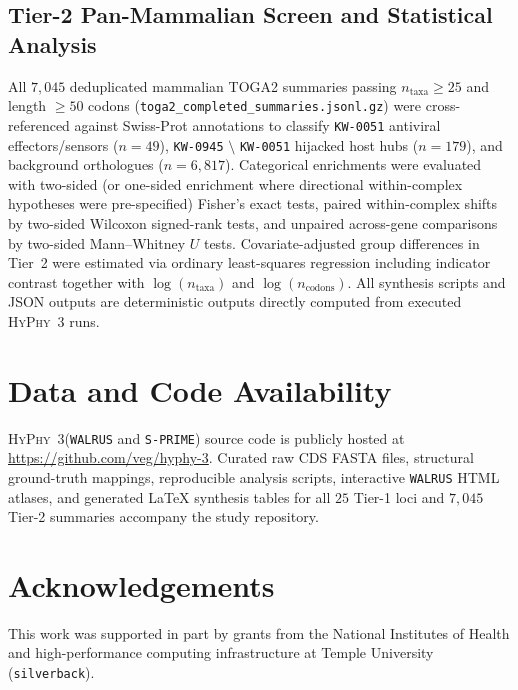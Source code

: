 \documentclass[11pt,letterpaper]{article}
\newcommand{\HyPhyThree}{\textsc{HyPhy~3}\xspace}
\newcommand{\WALRUS}{\texttt{WALRUS}\xspace}
\newcommand{\SPRIME}{\texttt{S-PRIME}\xspace}
\begin{document}
\subsection{Tier-2 Pan-Mammalian Screen and Statistical Analysis}

All $7,045$ deduplicated mammalian TOGA2 summaries passing $n_{\text{taxa}} \ge 25$ and length $\ge 50$ codons (\texttt{toga2\_completed\_summaries.jsonl.gz}) were cross-referenced against Swiss-Prot annotations to classify \texttt{KW-0051} antiviral effectors/sensors ($n = 49$), \texttt{KW-0945} $\setminus$ \texttt{KW-0051} hijacked host hubs ($n = 179$), and background orthologues ($n = 6,817$). Categorical enrichments were evaluated with two-sided (or one-sided enrichment where directional within-complex hypotheses were pre-specified) Fisher's exact tests, paired within-complex shifts by two-sided Wilcoxon signed-rank tests, and unpaired across-gene comparisons by two-sided Mann--Whitney $U$ tests. Covariate-adjusted group differences in Tier~2 were estimated via ordinary least-squares regression including indicator contrast together with $\log(n_{\text{taxa}})$ and $\log(n_{\text{codons}})$. All synthesis scripts and JSON outputs are deterministic outputs directly computed from executed \HyPhyThree runs.

\FloatBarrier

\section*{Data and Code Availability}

\HyPhyThree (\WALRUS and \SPRIME) source code is publicly hosted at \url{https://github.com/veg/hyphy-3}. Curated raw CDS FASTA files, structural ground-truth mappings, reproducible analysis scripts, interactive \WALRUS HTML atlases, and generated LaTeX synthesis tables for all $25$ Tier-1 loci and $7,045$ Tier-2 summaries accompany the study repository.

\section*{Acknowledgements}

This work was supported in part by grants from the National Institutes of Health and high-performance computing infrastructure at Temple University (\texttt{silverback}).



\end{document}
